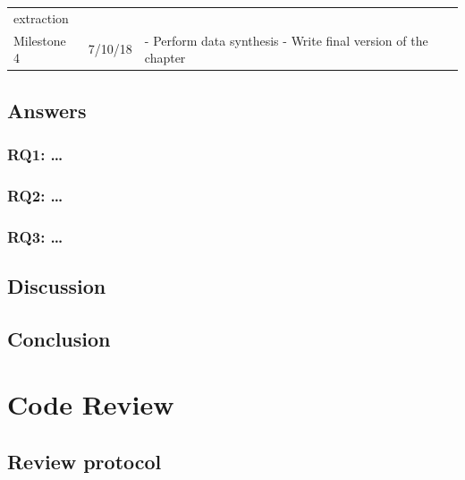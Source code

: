 \documentclass[]{book}
\begin{document}
\begin{longtable}[]{@{}lll@{}}
\begin{minipage}[t]{0.48\columnwidth}
extraction\strut
\end{minipage}\tabularnewline
\begin{minipage}[t]{0.22\columnwidth}\raggedright\strut
Milestone 4\strut
\end{minipage} & \begin{minipage}[t]{0.18\columnwidth}\raggedright\strut
7/10/18\strut
\end{minipage} & \begin{minipage}[t]{0.48\columnwidth}\raggedright\strut
- Perform data synthesis - Write final version of the chapter\strut
\end{minipage}\tabularnewline
\bottomrule
\end{longtable}

\section{Answers}\label{answers-3}

\subsection{RQ1: \ldots{}}\label{rq1}

\subsection{RQ2: \ldots{}}\label{rq2}

\subsection{RQ3: \ldots{}}\label{rq3}

\section{Discussion}\label{discussion}

\section{Conclusion}\label{conclusion}

\chapter{Code Review}\label{code-review}

\section{Review protocol}\label{review-protocol}
\end{document}
